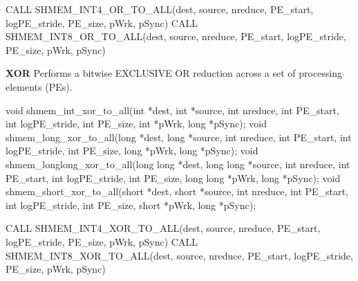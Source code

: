 CALL SHMEM_INT4_OR_TO_ALL(dest, source, nreduce, PE_start, logPE_stride, PE_size, pWrk, pSync)
CALL SHMEM_INT8_OR_TO_ALL(dest, source, nreduce, PE_start, logPE_stride, PE_size, pWrk, pSync)	

\bigskip
\textbf{XOR}\newline
Performs  a  bitwise  EXCLUSIVE OR reduction across a set of processing elements (\ac{PE}s).\newline
\synC %

void shmem_int_xor_to_all(int *dest, int *source, int nreduce, int PE_start, int logPE_stride, int PE_size, int *pWrk, long *pSync);
void shmem_long_xor_to_all(long *dest, long *source, int nreduce, int PE_start, int logPE_stride, int PE_size, long *pWrk, long *pSync);
void shmem_longlong_xor_to_all(long long *dest, long long *source, int nreduce, int PE_start, int logPE_stride, int PE_size, long long *pWrk, long *pSync);
void shmem_short_xor_to_all(short *dest, short *source, int nreduce, int PE_start, int logPE_stride, int PE_size, short *pWrk, long *pSync); %
\synF %

CALL SHMEM_INT4_XOR_TO_ALL(dest, source, nreduce, PE_start, logPE_stride, PE_size, pWrk, pSync)
CALL SHMEM_INT8_XOR_TO_ALL(dest, source, nreduce, PE_start, logPE_stride, PE_size, pWrk, pSync) %

